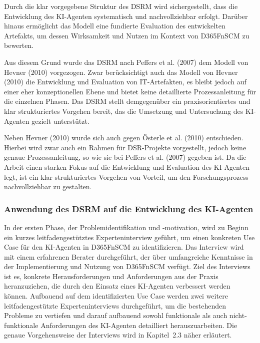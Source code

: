 Durch die klar vorgegebene Struktur des \ac{DSRM} wird sichergestellt, dass die Entwicklung des \ac{KI}-Agenten systematisch und nachvollziehbar erfolgt. Darüber hinaus ermöglicht das Modell eine fundierte Evaluation des entwickelten Artefakts, um dessen Wirksamkeit und Nutzen im Kontext von \ac{D365FnSCM} zu bewerten. 

Aus diesem Grund wurde das \ac{DSRM} nach Peffers et al. (2007) dem Modell von Hevner (2010) vorgezogen. Zwar berücksichtigt auch das Modell von Hevner (2010) die Entwicklung und Evaluation von IT-Artefakten, es bleibt jedoch auf einer eher konzeptionellen Ebene und bietet keine detaillierte Prozessanleitung für die einzelnen Phasen. Das \ac{DSRM} stellt demgegenüber ein praxisorientiertes und klar strukturiertes Vorgehen bereit, das die Umsetzung und Untersuchung des \ac{KI}-Agenten gezielt unterstützt.

Neben Hevner (2010) wurde sich auch gegen Österle et al. (2010) entschieden. Hierbei wird zwar auch ein Rahmen für \ac{DSR}-Projekte vorgestellt, jedoch keine genaue Prozessanleitung, so wie sie bei Peffers et al. (2007) gegeben ist. \cite[\pagef 4ff]{osterle_memorandum_2010} Da die Arbeit einen starken Fokus auf die Entwicklung und Evaluation des \ac{KI}-Agenten legt, ist ein klar strukturiertes Vorgehen von Vorteil, um den Forschungsprozess nachvollziehbar zu gestalten. 

\subsubsection{Anwendung des DSRM auf die Entwicklung des KI-Agenten}

In der ersten Phase, der Problemidentifikation und -motivation, wird zu Beginn ein kurzes leitfadengestütztes Experteninterview geführt, um einen konkreten Use Case für den \ac{KI}-Agenten in \ac{D365FnSCM} zu identifizieren. Das Interview wird mit einem erfahrenen Berater durchgeführt, der über umfangreiche Kenntnisse in der Implementierung und Nutzung von \ac{D365FnSCM} verfügt. Ziel des Interviews ist es, konkrete Herausforderungen und Anforderungen aus der Praxis heranzuziehen, die durch den Einsatz eines \ac{KI}-Agenten verbessert werden können. 
Aufbauend auf dem identifizierten Use Case werden zwei weitere leitfadengestützte Experteninterviews durchgeführt, um die bestehenden Probleme zu vertiefen und darauf aufbauend sowohl funktionale als auch nicht-funktionale Anforderungen des \ac{KI}-Agenten detailliert herauszuarbeiten. Die genaue Vorgehensweise der Interviews wird in Kapitel~2.3 näher erläutert. 

